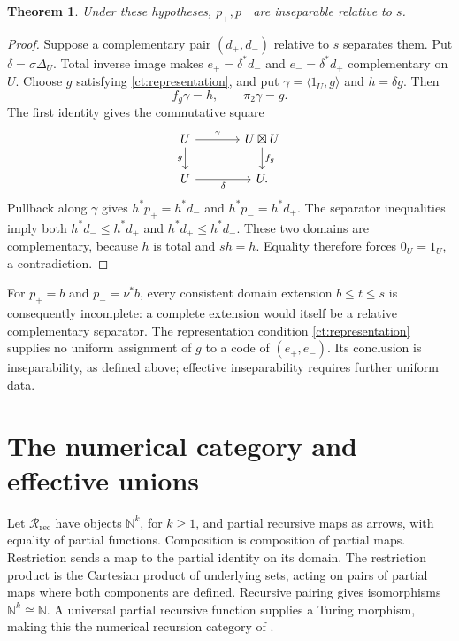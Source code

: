 \documentclass[11pt]{article}
\newtheorem{theorem}{Theorem}[section]
\theoremstyle{definition}
\theoremstyle{remark}
\newcommand{\R}{\mathscr R}
\newcommand{\N}{\mathbb N}
\begin{document}
\begin{theorem}\label{ct:representation-inseparable}
Under these hypotheses, $p_+,p_-$ are inseparable relative to $s$.
\end{theorem}
\begin{proof}
Suppose a complementary pair $(d_+,d_-)$ relative to $s$ separates them.
Put $\delta=\sigma\Delta_U$. Total inverse image makes
$e_+=\delta^*d_-$ and $e_-=\delta^*d_+$ complementary on $U$.
Choose $g$ satisfying \eqref{ct:representation}, and put
$\gamma=\langle1_U,g\rangle$ and $h=\delta g$. Then
\[
 f_g\gamma=h,\qquad\pi_2\gamma=g.
\]
The first identity gives the commutative square
\[
\begin{tikzcd}[column sep=large]
 U \arrow[r,"\gamma"] \arrow[d,"g"'] &
 U\boxtimes U \arrow[d,"f_g"]\\
 U \arrow[r,"\delta"'] & U.
\end{tikzcd}
\]
Pullback along $\gamma$ gives
$h^*p_+=h^*d_-$ and $h^*p_-=h^*d_+$.
The separator inequalities imply both
$h^*d_-\le h^*d_+$ and $h^*d_+\le h^*d_-$.
These two domains are complementary, because $h$ is total and
$sh=h$. Equality therefore forces $0_U=1_U$, a contradiction.
\end{proof}

For $p_+=b$ and $p_-=\nu^*b$, every consistent domain extension
$b\le t\le s$ is consequently incomplete: a complete extension would
itself be a relative complementary separator. The representation
condition \eqref{ct:representation} supplies no uniform assignment
of $g$ to a code of $(e_+,e_-)$. Its conclusion is inseparability, as
defined above; effective inseparability requires further uniform data.

\section{The numerical category and effective unions}
\label{num:ambient}

Let $\R_{\mathrm{rec}}$ have objects $\N^k$, for $k\ge1$, and partial
recursive maps as arrows, with equality of partial functions. Composition
is composition of partial maps. Restriction sends a map to the partial
identity on its domain. The restriction product is the Cartesian product
of underlying sets, acting on pairs of partial maps where both components
are defined. Recursive pairing gives isomorphisms $\N^k\cong\N$.
A universal partial recursive function supplies a Turing morphism, making
this the numerical recursion category of \cite{DPH,Heller}.
\end{document}
